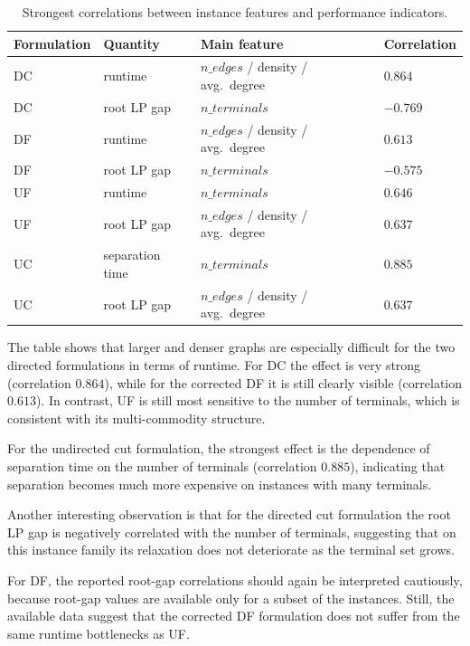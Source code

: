 \begin{table}[h!]
\centering
\small
\setlength{\tabcolsep}{5pt}
\begin{tabular}{llll}
    \toprule
    Formulation & Quantity & Main feature & Correlation \\
    \midrule
    DC & runtime & $n\_edges$ / density / avg.\ degree & $0.864$ \\
    DC & root LP gap & $n\_terminals$ & $-0.769$ \\
    DF & runtime & $n\_edges$ / density / avg.\ degree & $0.613$ \\
    DF & root LP gap & $n\_terminals$ & $-0.575$ \\
    UF & runtime & $n\_terminals$ & $0.646$ \\
    UF & root LP gap & $n\_edges$ / density / avg.\ degree & $0.637$ \\
    UC & separation time & $n\_terminals$ & $0.885$ \\
    UC & root LP gap & $n\_edges$ / density / avg.\ degree & $0.637$ \\
    \bottomrule
\end{tabular}
\caption{Strongest correlations between instance features and performance indicators.}
\label{tab:instance-dependence}
\end{table}

The table shows that larger and denser graphs are especially difficult for the
two directed formulations in terms of runtime. For DC the effect is very strong
(correlation $0.864$), while for the corrected DF it is still clearly visible
(correlation $0.613$). In contrast, UF is still most sensitive to the number of
terminals, which is consistent with its multi-commodity structure.

For the undirected cut formulation, the strongest
effect is the dependence of separation time on the number of terminals
(correlation $0.885$), indicating that separation becomes much more expensive on
instances with many terminals.

Another interesting observation is that for the
directed cut formulation the root LP gap is negatively correlated with the
number of terminals, suggesting that on this instance family its relaxation does
not deteriorate as the terminal set grows.

For DF, the reported root-gap correlations should again be interpreted
cautiously, because root-gap values are available only for a subset of the
instances. Still, the available data suggest that the corrected DF formulation
does not suffer from the same runtime bottlenecks as UF.



